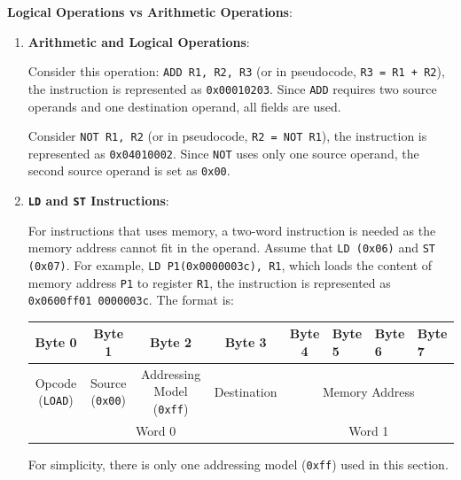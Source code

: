 \textbf{Logical Operations vs Arithmetic Operations}:

\begin{enumerate}

\item \textbf{Arithmetic and Logical Operations}:

Consider this operation: \texttt{ADD R1, R2, R3} (or in pseudocode, \texttt{R3 = R1 + R2}),
the instruction is represented as \texttt{0x00010203}. Since \texttt{ADD} requires two source
operands and one destination operand, all fields are used.

Consider \texttt{NOT R1, R2} (or in pseudocode, \texttt{R2 = NOT R1}), the instruction is
represented as \texttt{0x04010002}. Since \texttt{NOT} uses only one source operand, the
second source operand is set as \texttt{0x00}.

\item \textbf{\texttt{LD} and \texttt{ST} Instructions}:

For instructions that uses memory, a two-word instruction is needed as the memory address
cannot fit in the operand. Assume that \texttt{LD (0x06)} and \texttt{ST (0x07)}.
For example, \texttt{LD P1(0x0000003c), R1}, which loads the content of
memory address \texttt{P1} to register \texttt{R1}, the instruction is represented as
\texttt{0x0600ff01 0000003c}. The format is:
\begin{table}[H]
    \centering
    \begin{tabular}{ccccclll}
    Byte 0                       & Byte 1                                     & Byte 2                                      & Byte 3                                   & Byte 4    & Byte 5    & Byte 6    & Byte 7   \\ \hline
    \multicolumn{1}{|c|}{Opcode (\texttt{LOAD})} & \multicolumn{1}{c|}{Source (\texttt{0x00})} & \multicolumn{1}{c|}{Addressing Model (\texttt{0xff})} & \multicolumn{1}{c|}{Destination} & \multicolumn{4}{c|}{Memory Address} \\ \hline
    \multicolumn{4}{c}{Word 0}                                                                                                                                         & \multicolumn{4}{c}{Word 1}                  
    \end{tabular}
\end{table}

\begin{remark}
    For simplicity, there is only one addressing model (\texttt{0xff}) used in this section.
\end{remark}


\end{enumerate}
